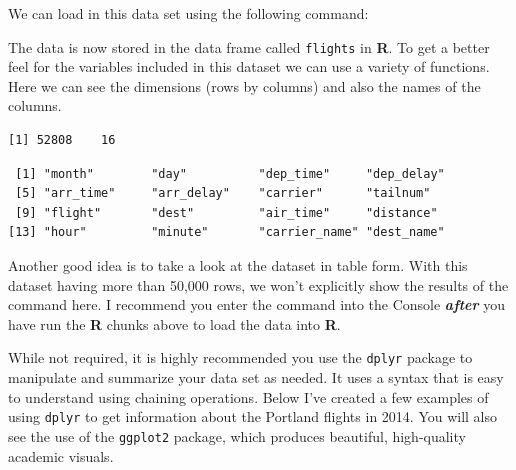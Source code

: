 \documentclass[12pt,twoside]{Mactemplate}
\theoremstyle{definition}
\theoremstyle{definition}
\theoremstyle{definition}
\theoremstyle{remark}
\begin{document}
We can load in this data set using the following command:
\begin{Shaded}
\begin{Highlighting}[]
\StringTok{ }\NormalTok{(}\NormalTok{)}
\end{Highlighting}
\end{Shaded}
The data is now stored in the data frame called \texttt{flights} in
\textbf{R}. To get a better feel for the variables included in this
dataset we can use a variety of functions. Here we can see the
dimensions (rows by columns) and also the names of the columns.
\begin{Shaded}
\begin{Highlighting}[]
\end{Highlighting}
\end{Shaded}
\begin{verbatim}
[1] 52808    16
\end{verbatim}
\begin{Shaded}
\begin{Highlighting}[]
\end{Highlighting}
\end{Shaded}
\begin{verbatim}
 [1] "month"        "day"          "dep_time"     "dep_delay"   
 [5] "arr_time"     "arr_delay"    "carrier"      "tailnum"     
 [9] "flight"       "dest"         "air_time"     "distance"    
[13] "hour"         "minute"       "carrier_name" "dest_name"   
\end{verbatim}
Another good idea is to take a look at the dataset in table form. With
this dataset having more than 50,000 rows, we won't explicitly show the
results of the command here. I recommend you enter the command into the
Console \textbf{\emph{after}} you have run the \textbf{R} chunks above
to load the data into \textbf{R}.
\begin{Shaded}
\begin{Highlighting}[]
\end{Highlighting}
\end{Shaded}
While not required, it is highly recommended you use the \texttt{dplyr}
package to manipulate and summarize your data set as needed. It uses a
syntax that is easy to understand using chaining operations. Below I've
created a few examples of using \texttt{dplyr} to get information about
the Portland flights in 2014. You will also see the use of the
\texttt{ggplot2} package, which produces beautiful, high-quality
academic visuals.
\end{document}
